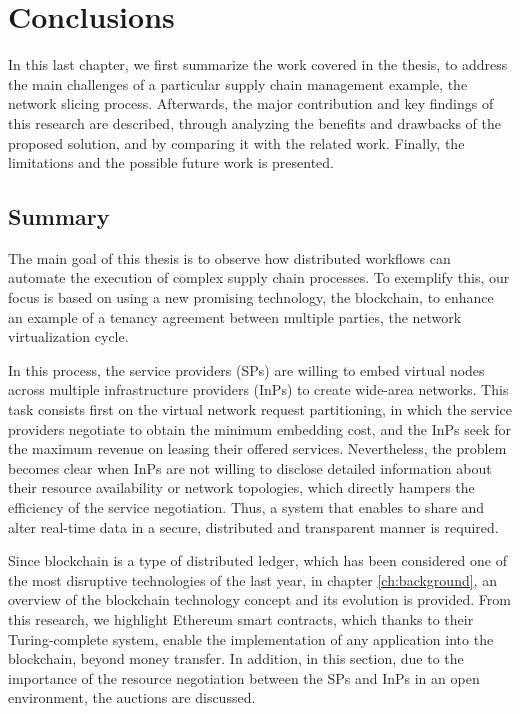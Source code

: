 \chapter{Conclusions}
\label{ch:closure}

In this last chapter, we first summarize the work covered in the thesis, to address the main challenges of a particular supply chain management example, the network slicing process. Afterwards, the major contribution and key findings of this research are described, through analyzing the benefits and drawbacks of the proposed solution, and by comparing it with the related work. Finally, the limitations and the possible future work is presented.

\section{Summary}

The main goal of this thesis is to observe how distributed workflows can automate the execution of complex supply chain processes. To exemplify this, our focus is based on using a new promising technology, the blockchain, to enhance an example of a tenancy agreement between multiple parties, the network virtualization cycle.

In this process, the service providers (SPs) are willing to embed virtual nodes across multiple infrastructure providers (InPs) to create wide-area networks. This task consists first on the virtual network request partitioning, in which the service providers negotiate to obtain the minimum embedding cost, and the InPs seek for the maximum revenue on leasing their offered services. Nevertheless, the problem becomes clear when InPs are not willing to disclose detailed information about their resource availability or network topologies, which directly hampers the efficiency of the service negotiation. Thus, a system that enables to share and alter real-time data in a secure, distributed and transparent manner is required.

Since blockchain is a type of distributed ledger, which has been considered one of the most disruptive technologies of the last year, in chapter \ref{ch:background}, an overview of the blockchain technology concept and its evolution is provided. From this research, we highlight Ethereum smart contracts, which thanks to their Turing-complete system, enable the implementation of any application into the blockchain, beyond money transfer. In addition, in this section, due to the importance of the resource negotiation between the SPs and InPs in an open environment, the auctions are discussed.

